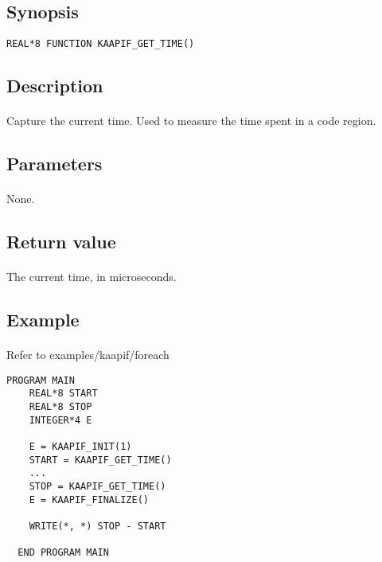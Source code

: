 \documentclass[a4paper, 11pt]{article}
\begin{document}
\subsection{Synopsis}
\begin{small}
\lstset{language=C}
\begin{lstlisting}[frame=tb]
REAL*8 FUNCTION KAAPIF_GET_TIME()
\end{lstlisting}
\end{small}

\subsection{Description}
\paragraph{}
Capture the current time. Used to measure the time spent in a code region.

\subsection{Parameters}
\paragraph{}
None.

\subsection{Return value}
\paragraph{}
The current time, in microseconds.

\subsection{Example}
\paragraph{}
Refer to examples/kaapif/foreach\\

\begin{small}
\begin{lstlisting}[frame=tb]
  PROGRAM MAIN
    REAL*8 START
    REAL*8 STOP
    INTEGER*4 E

    E = KAAPIF_INIT(1)
    START = KAAPIF_GET_TIME()
    ...
    STOP = KAAPIF_GET_TIME()
    E = KAAPIF_FINALIZE()

    WRITE(*, *) STOP - START

  END PROGRAM MAIN
\end{lstlisting}
\end{small}
\end{document}
